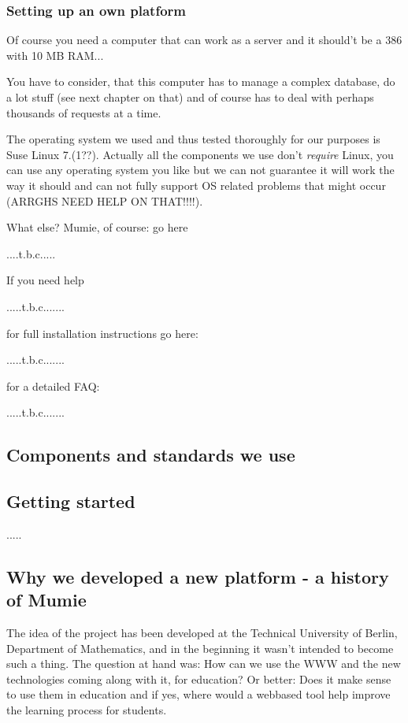 \documentclass{webpage}
\begin{document}
\subsubsection{Setting up an own platform}
Of course you need a computer that can work as a server and it should't be a 386 with 10 MB RAM...

You have to consider, that this computer has to manage a complex database, do a lot 
stuff (see next chapter on that) and of course has to deal with perhaps thousands of requests at a
time.

The operating system we used and thus tested thoroughly for our purposes is Suse Linux 7.(1??).
Actually all the components we use don't \emph{ require} Linux, you can use any operating system you like
but we can not guarantee it will work the way it should and can not fully support OS related problems
that might occur (ARRGHS NEED HELP ON THAT!!!!).

What else? Mumie, of course: go here 

....t.b.c.....

If you need help 

.....t.b.c.......

for full installation instructions go here:

.....t.b.c.......

for a detailed FAQ:

.....t.b.c.......


\subsection{Components and standards we use}

\subsection{Getting started}
.....
\subsection{Why we developed a new platform - a history of Mumie}
The idea of the project has been developed at the Technical University of Berlin, Department of 
Mathematics, and in the beginning it wasn't intended to become such a  thing.
The question at hand was: How can we use the WWW and the new technologies coming along with it,
for education? Or better: Does it make sense to use them in education and if yes, where would a 
webbased tool help improve the learning process for students.
\end{document}

